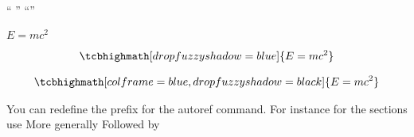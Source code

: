 
“ ”       
“”




\begin{mdframed}[style=MyFrame]
    $E = m c^2$
\end{mdframed}

\begin{equation*}
\tcbhighmath[drop fuzzy shadow=blue]
{
    \begin{aligned}
        E = m c^2
    \end{aligned}
}
\end{equation*} 

\begin{equation*}
\tcbhighmath[colframe=blue,drop fuzzy shadow=black]
{
    \begin{aligned}
        E = m c^2
    \end{aligned}
}
\end{equation*}

You can redefine the prefix for the autoref command. For instance for the sections use
\def\sectionautorefname{New prefix for the sections}
More generally
\def\<type>autorefname{<new name>}
Followed by
\addto\extrasenglish{%
  \renewcommand{\sectionautorefname}{Section}%
}





